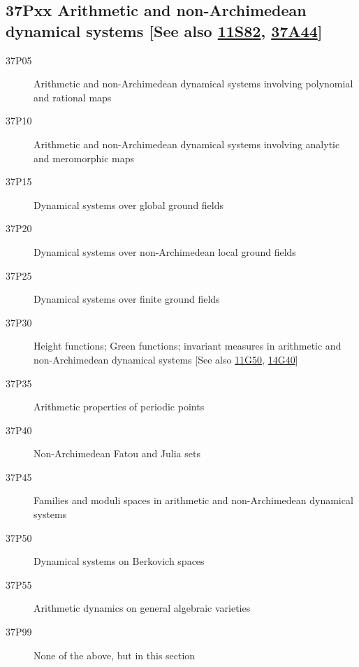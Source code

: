 \documentclass[letterpaper]{article}
\begin{document}
\subsection*{37Pxx  Arithmetic and non-Archimedean dynamical systems [See also \hyperref[11S82]{11S82}, \hyperref[37A44]{37A44}] }\label{37Pxx}
\begin{description} 
\item [37P05]\label{37P05} Arithmetic and non-Archimedean dynamical systems involving polynomial and rational maps
\item [37P10]\label{37P10} Arithmetic and non-Archimedean dynamical systems involving analytic and meromorphic maps
\item [37P15]\label{37P15} Dynamical systems over global ground fields
\item [37P20]\label{37P20} Dynamical systems over non-Archimedean local ground fields
\item [37P25]\label{37P25} Dynamical systems over finite ground fields 
\item [37P30]\label{37P30} Height functions; Green functions; invariant measures in arithmetic and non-Archimedean dynamical systems [See also \hyperref[11G50]{11G50}, \hyperref[14G40]{14G40}]
\item [37P35]\label{37P35} Arithmetic properties of periodic points
\item [37P40]\label{37P40} Non-Archimedean Fatou and Julia sets
\item [37P45]\label{37P45} Families and moduli spaces in arithmetic and non-Archimedean dynamical systems
\item [37P50]\label{37P50} Dynamical systems on Berkovich spaces
\item [37P55]\label{37P55} Arithmetic dynamics on general algebraic varieties
\item [37P99]\label{37P99} None of the above, but in this section
\end{description}
\end{document}
